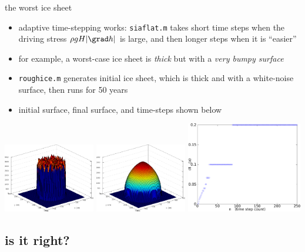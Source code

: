 \begin{frame}{the worst ice sheet}

\begin{itemize}
\item adaptive time-stepping works: \texttt{siaflat.m} takes short time steps when the driving stress $\rho g H |\grad h|$ is large, and then longer steps when it is ``easier''
\item for example, a worst-case ice sheet is \emph{thick} but with a \emph{very bumpy surface}
\item \texttt{roughice.m} generates initial ice sheet, which is thick and with a white-noise surface, then runs for 50 years
\item initial surface, final surface, and time-steps shown below
\end{itemize}

\begin{center}
\includegraphics[width=0.3\textwidth]{photos/roughinitial}  \includegraphics[width=0.3\textwidth]{photos/roughfinal} \includegraphics[width=0.38\textwidth]{photos/roughtimesteps}
\end{center}
\end{frame}


\subsection{is it right?}

